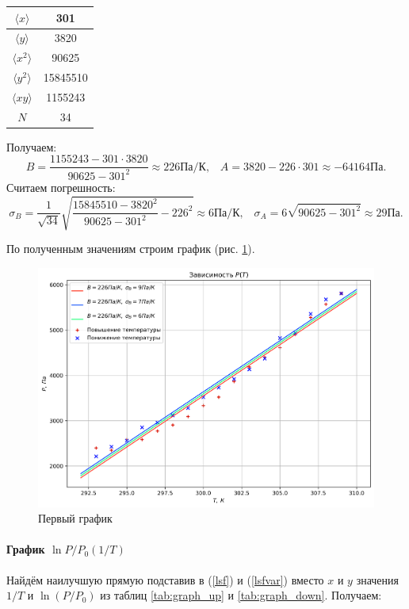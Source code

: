 \documentclass[a4paper,12pt]{article} %
\begin{document}
\begin{enumerate}
\begin{center}
\begin{tabular}{|c|c|}
\hline 
$\langle x \rangle$ & 301 \\ 
\hline 
$\langle y \rangle$ & 3820 \\ 
\hline 
$\langle x^2 \rangle$ & 90625 \\ 
\hline 
$\langle y^2 \rangle$ & 15845510 \\ 
\hline 
$\langle xy \rangle$ & 1155243 \\ 
\hline 
$N$ & 34 \\ 
\hline 
\end{tabular} 
\end{center}

Получаем:
\[
B = \frac{1155243 - 301 \cdot 3820}{90625 - 301^2} \approx 226 \text{Па/К}, \;\;\;
A = 3820 - 226 \cdot 301 \approx -64164 \text{Па}.
\]
Считаем погрешность:
\[
\sigma_B = \frac{1}{\sqrt{34}} \sqrt{\frac{15845510 - 3820^2}{90625 - 301^2} - 226^2} \approx 6 \text{Па/К}, \;\;\; \sigma_A = 6 \sqrt{90625 - 301^2} \approx 29 \text{Па}.
\]

\end{enumerate}

По полученным значениям строим график (рис. \ref{fig:graph1}).

\begin{figure}
\begin{center}
\includegraphics[width=\textwidth]{graph1.png}
\end{center}
\caption{Первый график}
\label{fig:graph1}
\end{figure}

\paragraph{График $ \ln{P/P_0} (1/T) $}
Найдём наилучшую прямую подставив в (\ref{lsf}) и (\ref{lsfvar}) вместо $ x $ и $ y $ значения $ 1/T $ и $ \ln{(P/P_0)} $ из таблиц \ref{tab:graph_up} и \ref{tab:graph_down}. Получаем:
\end{document}
